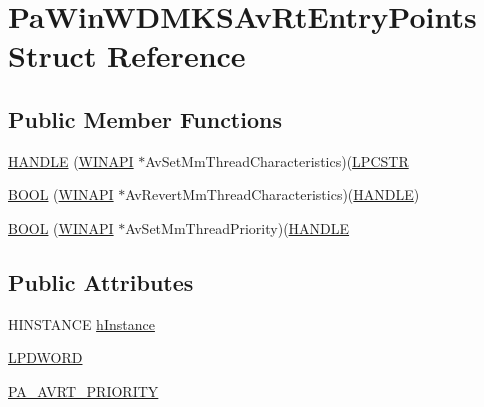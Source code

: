 \hypertarget{struct_pa_win_w_d_m_k_s_av_rt_entry_points}{}\section{Pa\+Win\+W\+D\+M\+K\+S\+Av\+Rt\+Entry\+Points Struct Reference}
\label{struct_pa_win_w_d_m_k_s_av_rt_entry_points}
\subsection*{Public Member Functions}
\begin{DoxyCompactItemize}
\item 
\hyperlink{struct_pa_win_w_d_m_k_s_av_rt_entry_points_a653f30d9ed27e04e2d475bdc25bdc368}{H\+A\+N\+D\+LE} (\hyperlink{mapinls_8h_a9aa60e1ead64be77ad551e745cbfd4d3}{W\+I\+N\+A\+PI} $\ast$Av\+Set\+Mm\+Thread\+Characteristics)(\hyperlink{mapinls_8h_a866fd74f5159bb4d319261005a5e85e0}{L\+P\+C\+S\+TR}
\item 
\hyperlink{struct_pa_win_w_d_m_k_s_av_rt_entry_points_a2506f801b633aed5b5eafdec39156309}{B\+O\+OL} (\hyperlink{mapinls_8h_a9aa60e1ead64be77ad551e745cbfd4d3}{W\+I\+N\+A\+PI} $\ast$Av\+Revert\+Mm\+Thread\+Characteristics)(\hyperlink{_sound_touch_d_l_l_8h_aa8c0374618b33785ccb02f74bcfebc46}{H\+A\+N\+D\+LE})
\item 
\hyperlink{struct_pa_win_w_d_m_k_s_av_rt_entry_points_a454c1cf35d7515227965fb276b733bd7}{B\+O\+OL} (\hyperlink{mapinls_8h_a9aa60e1ead64be77ad551e745cbfd4d3}{W\+I\+N\+A\+PI} $\ast$Av\+Set\+Mm\+Thread\+Priority)(\hyperlink{_sound_touch_d_l_l_8h_aa8c0374618b33785ccb02f74bcfebc46}{H\+A\+N\+D\+LE}
\end{DoxyCompactItemize}
\subsection*{Public Attributes}
\begin{DoxyCompactItemize}
\item 
H\+I\+N\+S\+T\+A\+N\+CE \hyperlink{struct_pa_win_w_d_m_k_s_av_rt_entry_points_a01e8bf87daf173079d8cc9eab3bb91ea}{h\+Instance}
\item 
\hyperlink{struct_pa_win_w_d_m_k_s_av_rt_entry_points_a114899ed72054b8ffe800683e89615c8}{L\+P\+D\+W\+O\+RD}
\item 
\hyperlink{struct_pa_win_w_d_m_k_s_av_rt_entry_points_a5852d421e90994f3266f994420047009}{P\+A\+\_\+\+A\+V\+R\+T\+\_\+\+P\+R\+I\+O\+R\+I\+TY}
\end{DoxyCompactItemize}


